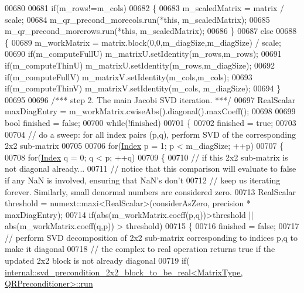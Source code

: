\begin{DoxyCode}
00680 
00681   \textcolor{keywordflow}{if}(m\_rows!=m\_cols)
00682   \{
00683     m\_scaledMatrix = matrix / scale;
00684     m\_qr\_precond\_morecols.run(*\textcolor{keyword}{this}, m\_scaledMatrix);
00685     m\_qr\_precond\_morerows.run(*\textcolor{keyword}{this}, m\_scaledMatrix);
00686   \}
00687   \textcolor{keywordflow}{else}
00688   \{
00689     m\_workMatrix = matrix.block(0,0,m\_diagSize,m\_diagSize) / scale;
00690     \textcolor{keywordflow}{if}(m\_computeFullU) m\_matrixU.setIdentity(m\_rows,m\_rows);
00691     \textcolor{keywordflow}{if}(m\_computeThinU) m\_matrixU.setIdentity(m\_rows,m\_diagSize);
00692     \textcolor{keywordflow}{if}(m\_computeFullV) m\_matrixV.setIdentity(m\_cols,m\_cols);
00693     \textcolor{keywordflow}{if}(m\_computeThinV) m\_matrixV.setIdentity(m\_cols, m\_diagSize);
00694   \}
00695 
00696   \textcolor{comment}{/*** step 2. The main Jacobi SVD iteration. ***/}
00697   RealScalar maxDiagEntry = m\_workMatrix.cwiseAbs().diagonal().maxCoeff();
00698 
00699   \textcolor{keywordtype}{bool} finished = \textcolor{keyword}{false};
00700   \textcolor{keywordflow}{while}(!finished)
00701   \{
00702     finished = \textcolor{keyword}{true};
00703 
00704     \textcolor{comment}{// do a sweep: for all index pairs (p,q), perform SVD of the corresponding 2x2 sub-matrix}
00705 
00706     \textcolor{keywordflow}{for}(\hyperlink{group___s_v_d___module_a6229a37997eca1072b52cca5ee7a2bec}{Index} p = 1; p < m\_diagSize; ++p)
00707     \{
00708       \textcolor{keywordflow}{for}(\hyperlink{group___s_v_d___module_a6229a37997eca1072b52cca5ee7a2bec}{Index} q = 0; q < p; ++q)
00709       \{
00710         \textcolor{comment}{// if this 2x2 sub-matrix is not diagonal already...}
00711         \textcolor{comment}{// notice that this comparison will evaluate to false if any NaN is involved, ensuring that NaN's
       don't}
00712         \textcolor{comment}{// keep us iterating forever. Similarly, small denormal numbers are considered zero.}
00713         RealScalar threshold = numext::maxi<RealScalar>(considerAsZero, precision * maxDiagEntry);
00714         \textcolor{keywordflow}{if}(abs(m\_workMatrix.coeff(p,q))>threshold || abs(m\_workMatrix.coeff(q,p)) > threshold)
00715         \{
00716           finished = \textcolor{keyword}{false};
00717           \textcolor{comment}{// perform SVD decomposition of 2x2 sub-matrix corresponding to indices p,q to make it diagonal}
00718           \textcolor{comment}{// the complex to real operation returns true if the updated 2x2 block is not already diagonal}
00719           \textcolor{keywordflow}{if}(
      \hyperlink{struct_eigen_1_1internal_1_1svd__precondition__2x2__block__to__be__real}{internal::svd\_precondition\_2x2\_block\_to\_be\_real<MatrixType, QRPreconditioner>::run}

\end{DoxyCode}
